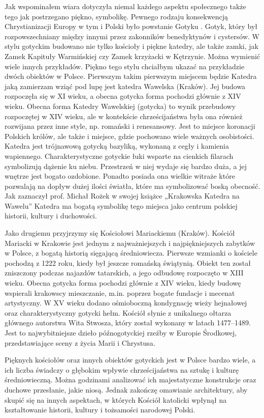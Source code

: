 Jak wspominałem wiara dotyczyła niemal każdego aspektu społecznego także tego jak postrzegano piękno, symbolikę. Pewnego rodzaju konsekwencją Chrystianizacji Europy w tym i Polski było powstanie Gotyku . Gotyk, który był rozpowszechniany między innymi przez zakonników benedyktynów i cystersów.
W stylu gotyckim budowano nie tylko kościoły i piękne katedry, ale także zamki, jak Zamek Kapituły Warmińskiej czy Zamek krzyżacki w Kętrzynie. Można wymienić wiele innych przykładów. Piękno tego stylu chciałbym ukazać na przykładzie dwóch obiektów w Polsce.
Pierwszym takim pierwszym miejscem będzie Katedra jaką zamierzam wziąć pod lupę jest katedra Wawelska (Kraków). Jej budowa rozpoczęła się w XI wieku, a obecna gotycka forma pochodzi głównie z XIV wieku. Obecna forma Katedry Wawelskiej (gotycka) to wynik przebudowy rozpoczętej w XIV wieku, ale w kontekście chrześcijaństwa była ona również rozwijana przez inne style, np. romański i renesansowy. Jest to miejsce koronacji Polskich królów, ale także i miejsce, gdzie pochowano wiele ważnych osobistości.  Katedra jest trójnawową gotycką bazyliką, wykonaną z cegły i kamienia wapiennego.  Charakterystyczne gotyckie łuki wsparte na cienkich filarach symbolizują dążenie ku niebu. Przestrzeń w niej wydaje się bardzo duża, a jej wnętrze jest bogato ozdobione. Ponadto posiada ona wielkie witraże które pozwalają na dopływ dużej ilości światła, które ma symbolizować boską obecność.  Jak zaznaczył prof. Michał Rożek w swojej książce „Krakowska Katedra na Wawelu” Katedra ma bogatą symbolikę tego miejsca jako centrum polskiej historii, kultury i duchowości.

Jako drugiemu przyjrzymy się Kościołowi Mariackiemu (Kraków).  Kościół Mariacki w Krakowie jest jednym z najważniejszych i najpiękniejszych zabytków w Polsce, z bogatą historią sięgającą średniowiecza. Pierwsze wzmianki o kościele pochodzą z 1222 roku, kiedy był jeszcze romańską świątynią. Obiekt ten został zniszczony podczas najazdów tatarskich, a jego odbudowę rozpoczęto w XIII wieku. Obecna gotycka forma pochodzi głównie z XIV wieku, kiedy budowę wspierali krakowscy mieszczanie, m.in. poprzez bogate fundacje i mecenat artystyczny. W XV wieku dodano ośmioboczną kondygnację wieży hejnałowej oraz charakterystyczny gotycki hełm. Kościół słynie z unikalnego ołtarza głównego autorstwa Wita Stwosza, który został wykonany w latach 1477–1489. Jest to najwybitniejsze dzieło późnogotyckiej rzeźby w Europie 
Środkowej, przedstawiające sceny z życia Marii i Chrystusa.

	Pięknych kościołów oraz innych obiektów gotyckich jest w Polsce bardzo wiele, a ich liczba świadczy o głębokim wpływie chrześcijaństwa na sztukę i kulturę średniowieczną. Można godzinami analizować ich majestatyczne konstrukcje oraz duchowe przesłanie, jakie niosą. Jednak zakończę omawianie architektury, aby skupić się na innych aspektach, w których Kościół katolicki wpłynął na kształtowanie historii, kultury i tożsamości narodowej Polski.
